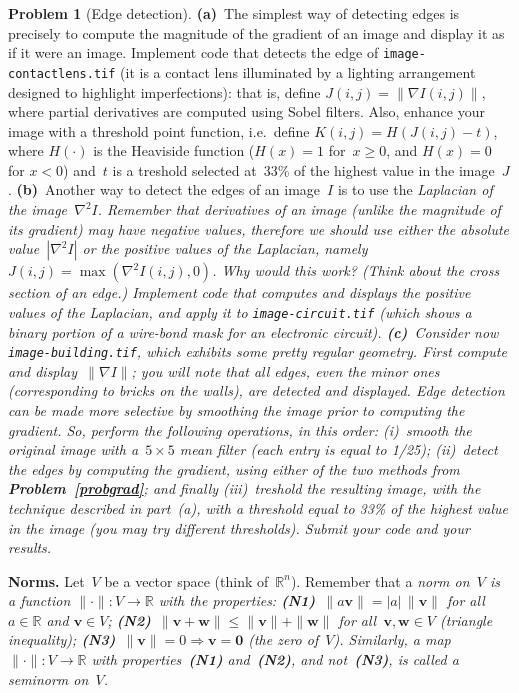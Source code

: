 \documentclass[11pt]{article}
\theoremstyle{plain}
\theoremstyle{definition}
\newtheorem{problem}{Problem}
\theoremstyle{remark}
\begin{document}
\begin{problem}[Edge detection]
\label{ed}
{\bf(a)}~The simplest way of detecting 
edges is precisely to compute the magnitude
of the gradient of an image and display it as if it were an image.
Implement code that detects the edge
of \verb|image-contactlens.tif|
(it is a contact lens illuminated by a lighting arrangement
designed to highlight imperfections):
that is, define $J(i,j)=\|\nabla I(i,j)\|$,
where partial derivatives are computed using Sobel filters.
Also, enhance your image with a threshold point function,
i.e.~define $K(i,j)=H(J(i,j)-t)$,
where $H(\cdot)$ is the Heaviside function
($H(x)=1$ for~$x\geq0$, and $H(x)=0$
for $x<0$)
and~$t$ is a treshold selected at~33\% of the 
highest value in the image~$J$. 
{\bf(b)}~Another way to 
detect the edges of an image~$I$ 
is to use the \em Laplacian \em 
of the image~$\nabla^2 I$. Remember that
derivatives of an image (unlike the \em magnitude \em
of its gradient) may 
have \em negative \em values, therefore we should use
either the absolute value~$|\nabla^2 I|$
or the \em positive values \em of the Laplacian,
namely $J(i,j)=\max(\nabla^2I(i,j),0)$.
Why would this work? (Think about the cross section of an edge.)
Implement code that computes and displays the 
positive values of the Laplacian, and apply
it to \verb|image-circuit.tif|
(which shows a \em binary \em portion of a wire-bond
mask for an electronic circuit).
{\bf(c)}~Consider now \verb|image-building.tif|,
which exhibits some pretty regular geometry.
First compute and display~$\|\nabla I\|$;
you will note that all edges, even the minor ones (corresponding to bricks on the walls), are detected
and displayed. 
Edge detection can be made more selective by smoothing the image prior
to computing the gradient.
So, perform the following operations, in this order: (i)~smooth the
original image with a~$5\times5$ mean filter (each entry is equal to 1/25); (ii)~detect the edges by computing the gradient,
using either of the two methods from {\bf Problem~\ref{probgrad}};
and finally (iii)~treshold the resulting image, with the technique described in part~(a), with a threshold equal to 33\% of the highest
value in the image (you may try different  thresholds). Submit your code and your results.
\end{problem}
\par\vspace{.05cm}
\hfill
\begin{minipage}{5.5in}
	{\bf Norms.}
	Let~$V$ be a vector space (think of~$\mathbb{R}^n$).
	Remember that a \em norm \em on~$V$ is a function $\| \cdot \|: V\rightarrow \mathbb{R}$ 
	with the properties:
	{\bf(N1)}~$\|a\mathbf{v}\| = |a|\,\|\mathbf{v}\|$ for all $a\in \mathbb{R}$ and $\mathbf{v}\in V$;
	{\bf(N2)}~$\|\mathbf{v}+\mathbf{w}\| \leq \|\mathbf{v}\|
	+\|\mathbf{w}\|$ for all~$\mathbf{v},
	\mathbf{w}\in V$ ({\it triangle inequality});
	{\bf(N3)}~$\|\mathbf{v}\|=0 \Rightarrow \mathbf{v}
	=\mathbf{0}$ (the zero of~$V$).
	Similarly, a map $\| \cdot \|: V\rightarrow \mathbb{R}$
	with properties~{\bf(N1)} and~{\bf(N2)}, and \em not\em~{\bf(N3)},  is called a
	\em seminorm \em on~$V$.
\end{minipage}
\end{document}

